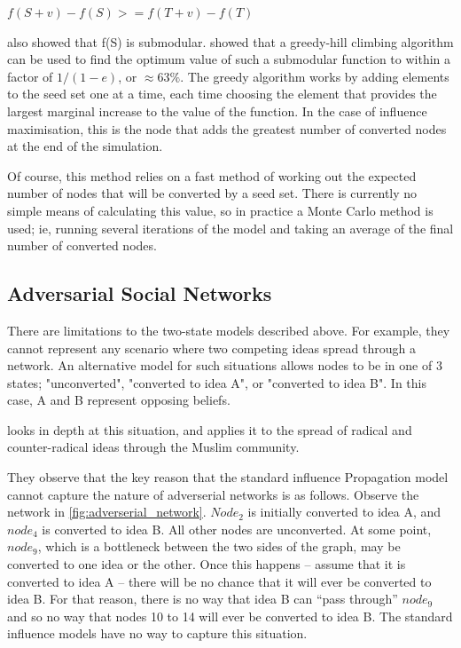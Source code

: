 \(f(S+v) - f(S) >= f(T+v) - f(T)\)

\cite{kempe} also showed that f(S) is submodular. \cite{nem} showed that a greedy-hill climbing algorithm can be used to find the optimum value of such a submodular function to within a factor of \(1/(1-e)\), or \(\approx 63\%\). The greedy algorithm works by adding elements to the seed set one at a time, each time choosing the element that provides the largest marginal increase to the value of the function. In the case of influence maximisation, this is the node that adds the greatest number of converted nodes at the end of the simulation.

Of course, this method relies on a fast method of working out the expected number of nodes that will be converted by a seed set. There is currently no simple means of calculating this value, so in practice a Monte Carlo method is used; ie, running several iterations of the model and taking an average of the final number of converted nodes.

\subsection{Adversarial Social Networks}

 There are limitations to the two-state models described above. For example, they cannot represent any scenario where two competing ideas spread through a network. An alternative model for such situations allows nodes to be in one of 3 states; "unconverted", "converted to idea A", or "converted to idea B". In this case, A and B represent opposing beliefs.

\cite{muslims} looks in depth at this situation, and applies it to the spread of radical and counter-radical ideas through the Muslim community.

They observe that the key reason that the standard influence Propagation model cannot capture the nature of adverserial networks is as follows. Observe the network in \ref{fig:adverserial_network}. \(Node_2\) is initially converted to idea A, and \(node_4\) is converted to idea B. All other nodes are unconverted. At some point, \(node_9\), which is a bottleneck between the two sides of the graph, may be converted to one idea or the other. Once this happens -- assume that it is converted to idea A -- there will be no chance that it will ever be converted to idea B. For that reason, there is no way that idea B can ``pass through'' \(node_9\) and so no way that nodes 10 to 14 will ever be converted to idea B. The standard influence models have no way to capture this situation.


